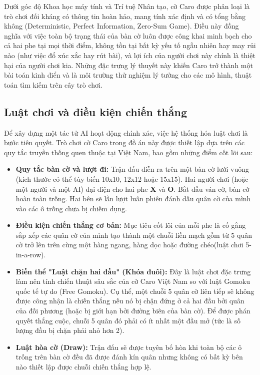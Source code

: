 Dưới góc độ Khoa học máy tính và Trí tuệ Nhân tạo, cờ Caro được phân loại là trò chơi đối kháng có thông tin hoàn hảo, mang tính xác định và có tổng bằng không (Deterministic, Perfect Information, Zero-Sum Game). Điều này đồng nghĩa với việc toàn bộ trạng thái của bàn cờ luôn được công khai minh bạch cho cả hai phe tại mọi thời điểm, không tồn tại bất kỳ yếu tố ngẫu nhiên hay may rủi nào (như việc đổ xúc xắc hay rút bài), và lợi ích của người chơi này chính là thiệt hại của người chơi kia. Những đặc trưng lý thuyết này khiến Caro trở thành một bài toán kinh điển và là môi trường thử nghiệm lý tưởng cho các mô hình, thuật toán tìm kiếm trên cây trò chơi.

\subsection{Luật chơi và điều kiện chiến thắng}

Để xây dựng một tác tử AI hoạt động chính xác, việc hệ thống hóa luật chơi là bước tiên quyết. Trò chơi cờ Caro trong đồ án này được thiết lập dựa trên các quy tắc truyền thống quen thuộc tại Việt Nam, bao gồm những điểm cốt lõi sau:

\begin{itemize}
	
	\item \textbf{Quy tắc bàn cờ và lượt đi:} Trận đấu diễn ra trên một bàn cờ lưới vuông (kích thước có thể tùy biến 10x10, 12x12 hoặc 15x15). Hai người chơi (hoặc một người và một AI) đại diện cho hai phe \textbf{X} và \textbf{O}. Bắt đầu ván cờ, bàn cờ hoàn toàn trống. Hai bên sẽ lần lượt luân phiên đánh dấu quân cờ của mình vào các ô trống chưa bị chiếm dụng.

	\item \textbf{Điều kiện chiến thắng cơ bản:} Mục tiêu cốt lõi của mỗi phe là cố gắng sắp xếp các quân cờ của mình tạo thành một chuỗi liền mạch gồm từ 5 quân cờ trở lên trên cùng một hàng ngang, hàng dọc hoặc đường chéo(luật chơi 5-in-a-row).

	\item \textbf{Biến thể "Luật chặn hai đầu" (Khóa đuôi):} Đây là luật chơi đặc trưng làm nên tính chiến thuật sâu sắc của cờ Caro Việt Nam so với luật Gomoku quốc tế tự do (Free Gomoku). Cụ thể, một chuỗi 5 quân cờ liên tiếp sẽ không được công nhận là chiến thắng nếu nó bị chặn đứng ở cả hai đầu bởi quân của đối phương (hoặc bị giới hạn bởi đường biên của bàn cờ). Để được phán quyết thắng cuộc, chuỗi 5 quân đó phải có ít nhất một đầu mở (tức là số lượng đầu bị chặn phải nhỏ hơn 2).

	\item \textbf{Luật hòa cờ (Draw):} Trận đấu sẽ được tuyên bố hòa khi toàn bộ các ô trống trên bàn cờ đều đã được đánh kín quân nhưng không có bất kỳ bên nào thiết lập được chuỗi chiến thắng hợp lệ.
	
\end{itemize}

